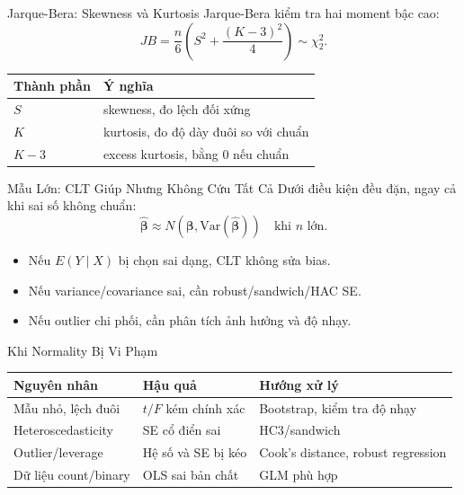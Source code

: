 \documentclass[aspectratio=169,professionalfonts]{beamer}
\begin{document}
\begin{frame}{Jarque-Bera: Skewness và Kurtosis}
  \small
  Jarque-Bera kiểm tra hai moment bậc cao:
  \[
    JB
    =
    \frac{n}{6}
    \left(
      S^2+\frac{(K-3)^2}{4}
    \right)
    \sim \chi^2_2.
  \]
  \begin{tabularx}{\textwidth}{@{}lX@{}}
    \toprule
    Thành phần & Ý nghĩa \\
    \midrule
    $S$ & skewness, đo lệch đối xứng \\
    $K$ & kurtosis, đo độ dày đuôi so với chuẩn \\
    $K-3$ & excess kurtosis, bằng 0 nếu chuẩn \\
    \bottomrule
  \end{tabularx}
\end{frame}

\begin{frame}{Mẫu Lớn: CLT Giúp Nhưng Không Cứu Tất Cả}
  \small
  Dưới điều kiện đều đặn, ngay cả khi sai số không chuẩn:
  \[
    \hat{\boldsymbol{\beta}}
    \approx
    N\left(\boldsymbol{\beta},\mathrm{Var}(\hat{\boldsymbol{\beta}})\right)
    \quad \text{khi } n \text{ lớn}.
  \]
  \begin{itemize}
    \item Nếu $E(Y\mid X)$ bị chọn sai dạng, CLT không sửa bias.
    \item Nếu variance/covariance sai, cần robust/sandwich/HAC SE.
    \item Nếu outlier chi phối, cần phân tích ảnh hưởng và độ nhạy.
  \end{itemize}
\end{frame}

\begin{frame}{Khi Normality Bị Vi Phạm}
  \small
  \begin{tabularx}{\textwidth}{@{}l>{\raggedright\arraybackslash}X>{\raggedright\arraybackslash}X@{}}
    \toprule
    Nguyên nhân & Hậu quả & Hướng xử lý \\
    \midrule
    Mẫu nhỏ, lệch đuôi & $t/F$ kém chính xác & Bootstrap, kiểm tra độ nhạy \\
    Heteroscedasticity & SE cổ điển sai & HC3/sandwich \\
    Outlier/leverage & Hệ số và SE bị kéo & Cook's distance, robust regression \\
    Dữ liệu count/binary & OLS sai bản chất & GLM phù hợp \\
    \bottomrule
  \end{tabularx}
\end{frame}
\end{document}

